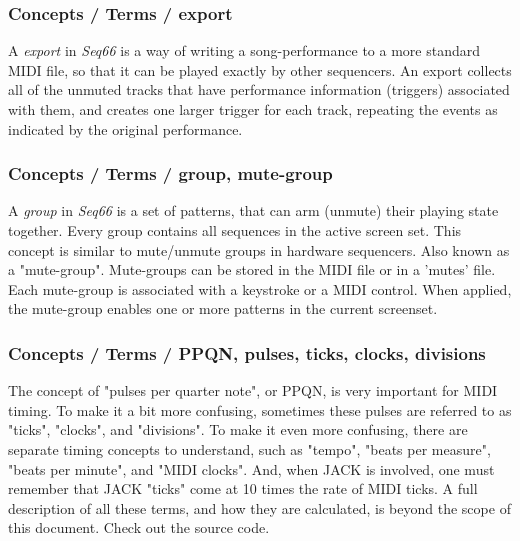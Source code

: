\subsubsection{Concepts / Terms / export}
\label{subsubsec:concepts_terms_export}

   A \textsl{export} in \textsl{Seq66} is a way of writing a
   song-performance to a more standard MIDI file, so that it can be played
   exactly by other sequencers.
   An export collects all of the unmuted tracks that have
   performance information (triggers) associated with them, and creates one
   larger trigger for each track, repeating the events as indicated by the
   original performance.

\subsubsection{Concepts / Terms / group, mute-group}
\label{subsubsec:concepts_terms_group}

   A \textsl{group} in \textsl{Seq66} is a
   set of patterns, that can arm (unmute) their playing state
   together.
   Every group contains all sequences in the active screen set. 
   This concept is similar to mute/unmute groups in hardware
   sequencers.
   Also known as a "mute-group".
   Mute-groups can be stored in the MIDI file or in a 'mutes' file.
   Each mute-group is associated with a keystroke or a MIDI control.
   When applied, the mute-group enables one or more patterns in the current
   screenset.

\subsubsection{Concepts / Terms / PPQN, pulses, ticks, clocks, divisions}
\label{subsubsec:concepts_terms_pulses}

   The concept of "pulses per quarter note", or PPQN, is very important for
   MIDI timing.  To make it a bit more confusing, sometimes these pulses are
   referred to as "ticks", "clocks", and "divisions".
   To make it even more confusing, there are separate timing concepts to
   understand, such as "tempo", "beats per measure", "beats per minute", and
   "MIDI clocks".
   And, when JACK is involved, one must remember that JACK "ticks" come at 10
   times the rate of MIDI ticks.
   A full description of all these terms, and how they are calculated, is
   beyond the scope of this document.  Check out the source code.

